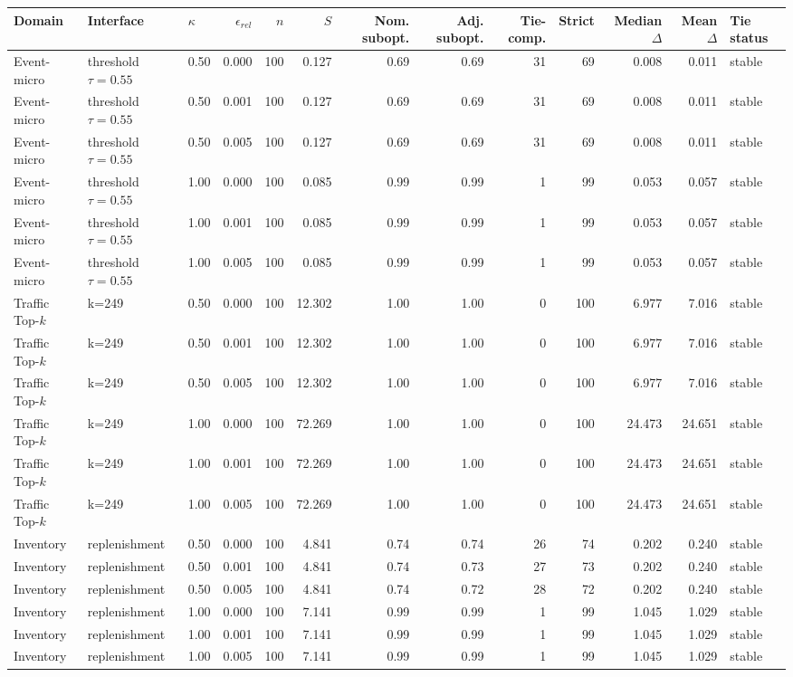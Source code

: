 \begin{tabular}{lllrrrrrrrrrl}
\toprule
Domain & Interface & $\kappa$ & $\epsilon_{rel}$ & $n$ & $S$ & Nom. subopt. & Adj. subopt. & Tie-comp. & Strict & Median $\Delta$ & Mean $\Delta$ & Tie status \\
\midrule
Event-micro & threshold $\tau=0.55$ & 0.50 & 0.000 & 100 & 0.127 & 0.69 & 0.69 & 31 & 69 & 0.008 & 0.011 & stable \\
Event-micro & threshold $\tau=0.55$ & 0.50 & 0.001 & 100 & 0.127 & 0.69 & 0.69 & 31 & 69 & 0.008 & 0.011 & stable \\
Event-micro & threshold $\tau=0.55$ & 0.50 & 0.005 & 100 & 0.127 & 0.69 & 0.69 & 31 & 69 & 0.008 & 0.011 & stable \\
Event-micro & threshold $\tau=0.55$ & 1.00 & 0.000 & 100 & 0.085 & 0.99 & 0.99 & 1 & 99 & 0.053 & 0.057 & stable \\
Event-micro & threshold $\tau=0.55$ & 1.00 & 0.001 & 100 & 0.085 & 0.99 & 0.99 & 1 & 99 & 0.053 & 0.057 & stable \\
Event-micro & threshold $\tau=0.55$ & 1.00 & 0.005 & 100 & 0.085 & 0.99 & 0.99 & 1 & 99 & 0.053 & 0.057 & stable \\
Traffic Top-\(k\) & k=249 & 0.50 & 0.000 & 100 & 12.302 & 1.00 & 1.00 & 0 & 100 & 6.977 & 7.016 & stable \\
Traffic Top-\(k\) & k=249 & 0.50 & 0.001 & 100 & 12.302 & 1.00 & 1.00 & 0 & 100 & 6.977 & 7.016 & stable \\
Traffic Top-\(k\) & k=249 & 0.50 & 0.005 & 100 & 12.302 & 1.00 & 1.00 & 0 & 100 & 6.977 & 7.016 & stable \\
Traffic Top-\(k\) & k=249 & 1.00 & 0.000 & 100 & 72.269 & 1.00 & 1.00 & 0 & 100 & 24.473 & 24.651 & stable \\
Traffic Top-\(k\) & k=249 & 1.00 & 0.001 & 100 & 72.269 & 1.00 & 1.00 & 0 & 100 & 24.473 & 24.651 & stable \\
Traffic Top-\(k\) & k=249 & 1.00 & 0.005 & 100 & 72.269 & 1.00 & 1.00 & 0 & 100 & 24.473 & 24.651 & stable \\
Inventory & replenishment & 0.50 & 0.000 & 100 & 4.841 & 0.74 & 0.74 & 26 & 74 & 0.202 & 0.240 & stable \\
Inventory & replenishment & 0.50 & 0.001 & 100 & 4.841 & 0.74 & 0.73 & 27 & 73 & 0.202 & 0.240 & stable \\
Inventory & replenishment & 0.50 & 0.005 & 100 & 4.841 & 0.74 & 0.72 & 28 & 72 & 0.202 & 0.240 & stable \\
Inventory & replenishment & 1.00 & 0.000 & 100 & 7.141 & 0.99 & 0.99 & 1 & 99 & 1.045 & 1.029 & stable \\
Inventory & replenishment & 1.00 & 0.001 & 100 & 7.141 & 0.99 & 0.99 & 1 & 99 & 1.045 & 1.029 & stable \\
Inventory & replenishment & 1.00 & 0.005 & 100 & 7.141 & 0.99 & 0.99 & 1 & 99 & 1.045 & 1.029 & stable \\
\bottomrule
\end{tabular}
